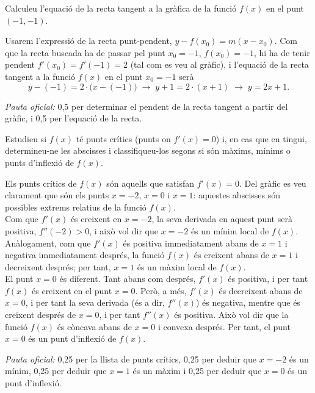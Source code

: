 \begin{apartats}

Calculeu l'equació de la recta tangent a la gràfica de la funció $f(x)$ en el punt $(-1,-1)$.

\begin{solucio}
Usarem l'expressió de la recta punt-pendent, $y-f(x_0)=m(x-x_0)$. Com que la recta buscada ha de passar pel
punt $x_0=-1$, $f(x_0)=-1$, hi ha de tenir pendent $f'(x_0)=f'(-1)=2$ (tal com es veu al gràfic), i
l'equació de la recta tangent a la funció $f(x)$ en el punt $x_0=-1$ serà
\[
y-(-1)=2\cdot\bigl(x-(-1)\bigr)\;\rightarrow\;y+1=2\cdot(x+1)\;\rightarrow\;y=2x+1 .
\]

\textit{Pauta oficial:} 0,5 per determinar el pendent de la recta tangent a partir del gràfic, i 0,5 per
l'equació de la recta.
\end{solucio}

Estudieu si $f(x)$ té punts crítics (punts on $f'(x)=0$) i, en cas que en tingui, determineu-ne les
abscisses i classifiqueu-los segons si són màxims, mínims o punts d'inflexió de $f(x)$.

\begin{solucio}
Els punts crítics de $f(x)$ són aquells que satisfan $f'(x)=0$. Del gràfic es veu clarament que són els
punts $x=-2$, $x=0$ i $x=1$: aquestes abscisses són possibles extrems relatius de la funció $f(x)$.\\
Com que $f'(x)$ és creixent en $x=-2$, la seva derivada en aquest punt serà positiva, $f''(-2)>0$, i això
vol dir que $x=-2$ és un mínim local de $f(x)$.\\
Anàlogament, com que $f'(x)$ és positiva immediatament abans de $x=1$ i negativa immediatament després, la
funció $f(x)$ és creixent abans de $x=1$ i decreixent després; per tant, $x=1$ és un màxim local de
$f(x)$.\\
El punt $x=0$ és diferent. Tant abans com després, $f'(x)$ és positiva, i per tant $f(x)$ és creixent en el
punt $x=0$. Però, a més, $f'(x)$ és decreixent abans de $x=0$, i per tant la seva derivada (és a dir,
$f''(x)$) és negativa, mentre que és creixent després de $x=0$, i per tant $f''(x)$ és positiva. Això vol
dir que la funció $f(x)$ és còncava abans de $x=0$ i convexa després. Per tant, el punt $x=0$ és un punt
d'inflexió de $f(x)$.

\textit{Pauta oficial:} 0,25 per la llista de punts crítics, 0,25 per deduir que $x=-2$ és un mínim, 0,25
per deduir que $x=1$ és un màxim i 0,25 per deduir que $x=0$ és un punt d'inflexió.
\end{solucio}


\end{apartats}
